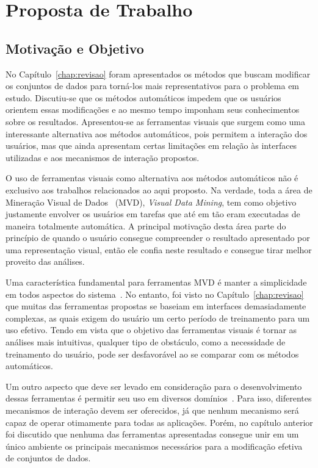 \chapter{Proposta de Trabalho}\label{chap:proposta}


\section{Motivação e Objetivo}

No Capítulo~\ref{chap:revisao} foram apresentados os métodos
que buscam modificar os conjuntos de dados para torná-los
mais representativos para o problema em estudo.  Discutiu-se
que os métodos automáticos impedem que os usuários orientem
essas modificações e ao mesmo tempo imponham seus
conhecimentos sobre os resultados.  Apresentou-se as
ferramentas visuais que surgem como uma interessante
alternativa aos métodos automáticos, pois permitem a
interação dos usuários, mas que ainda apresentam certas
limitações em relação às interfaces utilizadas e aos
mecanismos de interação propostos.

O uso de ferramentas visuais como alternativa aos métodos
automáticos não é exclusivo aos trabalhos relacionados
ao aqui proposto. Na verdade, toda a área de
Mineração Visual de Dados~\cite{Wong1999} (MVD),
\emph{Visual Data Mining}, tem como objetivo justamente
envolver os usuários em tarefas que até em tão eram
executadas de maneira totalmente automática. A principal
motivação desta área parte do princípio de quando o usuário
consegue compreender o resultado apresentado por uma
representação visual, então ele confia neste resultado e
consegue tirar melhor proveito das análises.

Uma característica fundamental para ferramentas MVD é manter
a simplicidade em todos aspectos do sistema~\cite{Wong1999}.
No entanto, foi visto no Capítulo~\ref{chap:revisao} que
muitas das ferramentas propostas se baseiam em interfaces
demasiadamente complexas, as quais exigem do usuário um
certo período de treinamento para um uso efetivo. Tendo em
vista que o objetivo das ferramentas visuais é tornar as
análises mais intuitivas, qualquer tipo de obstáculo, como a
necessidade de treinamento do usuário, pode ser desfavorável
ao se comparar com os métodos automáticos.

Um outro aspecto que deve ser levado em consideração para o
desenvolvimento dessas ferramentas é permitir seu uso em
diversos domínios~\cite{Wong1999}. Para isso, diferentes
mecanismos de interação devem ser oferecidos, já que nenhum
mecanismo será capaz de operar otimamente para todas as
aplicações. Porém, no capítulo anterior foi discutido
que nenhuma das ferramentas apresentadas consegue unir em um
único ambiente os principais mecanismos necessários para a
modificação efetiva de conjuntos de dados.

